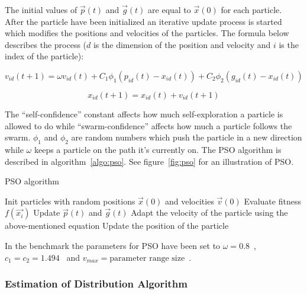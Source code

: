 The initial values of $\vec{p}(t)$ and $\vec{g}(t)$ are equal to $\vec{x}(0)$ for each particle. After the particle have been initialized an iterative update process is started which modifies the positions and velocities of the particles. The formula below describes the process ($d$ is the dimension of the position and velocity and $i$ is the index of the particle):

\begin{equation}
  v_{id} (t+1) = \omega v_{id} (t) + C_1 \phi_1 (p_{id} (t) - x_{id} (t)) + C_2 \phi_2 (g_{id} (t) - x_{id} (t))
\end{equation}

\begin{equation}
  x_{id} (t+1) = x_{id} (t) + v_{id} (t+1)
\end{equation}

The “self-confidence” constant affects how much self-exploration a particle is allowed to do while “swarm-confidence” affects how much a particle follows the swarm. $\phi_1$ and $\phi_2$ are random numbers which push the particle in a new direction while $\omega$ keeps a particle on the path it’s currently on. The PSO algorithm is described in algorithm~\ref{algo:pso}. See figure~\ref{fig:pso} for an illustration of PSO.

\begin{algorithm}[h]
  \caption{PSO algorithm}
  \label{algo:pso}
    \begin{algorithmic}
      \State Init particles with random positions
      $\vec{x}(0)$ and velocities $\vec{v}(0)$
      \Repeat
          \State Evaluate fitness $f(\vec{x_i})$
          \State Update $\vec{p}(t)$ and $\vec{g}(t)$
          \State Adapt the velocity of the particle using the above-mentioned equation
          \State Update the position of the particle
        \EndFor
    \end{algorithmic}
\end{algorithm}



In the benchmark the parameters for PSO have been set to $\omega = 0.8$~\cite{shi1998modified}, $c_1 = c_2 = 1.494$~\cite{kennedy1999small} and $v_{max} = \text{parameter range size}$~\cite{Das2008}.

\subsubsection{Estimation of Distribution Algorithm}

